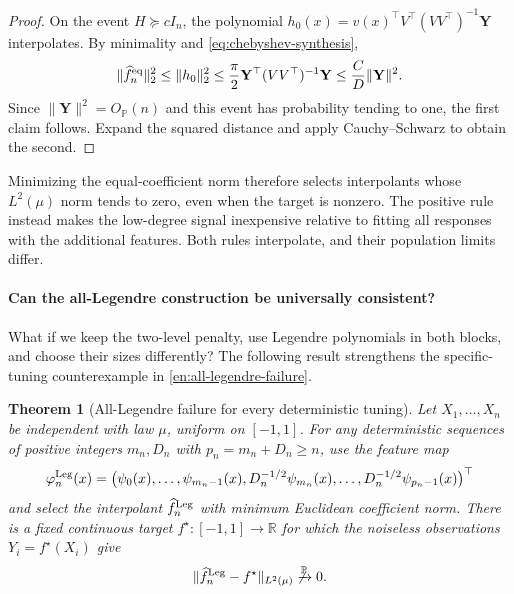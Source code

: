 \documentclass[11pt,twoside]{article}
\renewcommand{\P}{\mathbb P}
\newcommand{\R}{\mathbb R}
\newtheorem{theorem}{Theorem}[section]
\theoremstyle{definition}
\theoremstyle{remark}
\begin{document}
\begin{proof}
On the event $H\succeq cI_n$, the polynomial
$h_0(x)=v(x)^\top V^\top(VV^\top)^{-1}\mathbf Y$ interpolates. By minimality
and \cref{eq:chebyshev-synthesis},
\[
 \|\widehat f_n^{\rm eq}\|_2^2
 \le\|h_0\|_2^2
 \le\frac\pi2\mathbf Y^\top(VV^\top)^{-1}\mathbf Y
 \le\frac C D\|\mathbf Y\|^2.
\]
Since $\|\mathbf Y\|^2=O_{\P}(n)$ and this event has probability tending to
one, the first claim follows. Expand the squared distance and apply
Cauchy--Schwarz to obtain the second.
\end{proof}

Minimizing the equal-coefficient norm therefore selects interpolants whose
$L^2(\mu)$ norm tends to zero, even when the target is nonzero. The positive
rule instead makes the low-degree signal inexpensive relative to fitting all
responses with the additional features. Both rules interpolate, and their
population limits differ.

\paragraph{Can the all-Legendre construction be universally consistent?}
What if we keep the two-level penalty, use Legendre polynomials in both
blocks, and choose their sizes differently? The following result strengthens
the specific-tuning counterexample in
\hyperlink{note:all-legendre-failure}{\cref*{en:all-legendre-failure}}.

\begin{theorem}[All-Legendre failure for every deterministic tuning]
\label{thm:all-legendre-tuning}
Let $X_1,\ldots,X_n$ be independent with law $\mu$, uniform on $[-1,1]$.
For any deterministic sequences of positive integers $m_n,D_n$ with
$p_n=m_n+D_n\ge n$, use the feature map
\[
 \varphi_n^{\rm Leg}(x)
 =\bigl(\psi_0(x),\ldots,\psi_{m_n-1}(x),
 D_n^{-1/2}\psi_{m_n}(x),\ldots,D_n^{-1/2}\psi_{p_n-1}(x)\bigr)^\top
\]
and select the interpolant $\widehat f_n^{\rm Leg}$ with minimum Euclidean
coefficient norm. There is a fixed continuous target
$f^\star:[-1,1]\to\R$ for which the noiseless observations
$Y_i=f^\star(X_i)$ give
\[
 \|\widehat f_n^{\rm Leg}-f^\star\|_{L^2(\mu)}
 \not\xrightarrow{\P}0.
\]
\end{theorem}
\end{document}
